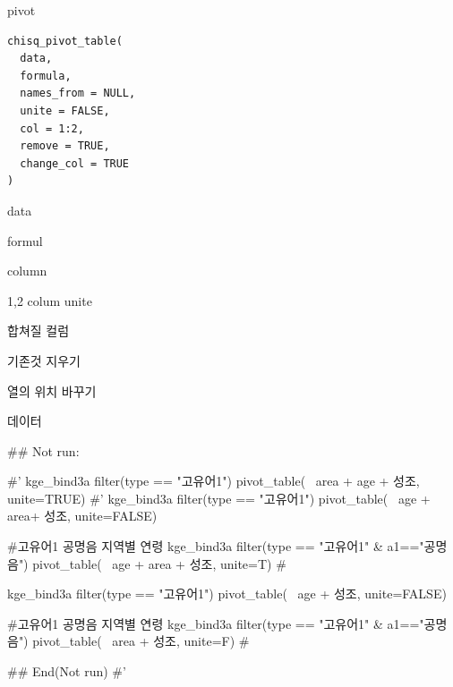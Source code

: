 \documentclass[a4paper]{book}
\begin{document}
%
\begin{Description}
pivot
\end{Description}
%
\begin{Usage}
\begin{verbatim}
chisq_pivot_table(
  data,
  formula,
  names_from = NULL,
  unite = FALSE,
  col = 1:2,
  remove = TRUE,
  change_col = TRUE
)
\end{verbatim}
\end{Usage}
%
\begin{Arguments}
\begin{ldescription}
\item[\code{data}] data

\item[\code{formula}] formul

\item[\code{names\_from}] column

\item[\code{unite}] 1,2 colum unite

\item[\code{col}] 합쳐질 컬럼

\item[\code{remove}] 기존것 지우기

\item[\code{change\_col}] 열의 위치 바꾸기
\end{ldescription}
\end{Arguments}
%
\begin{Value}
데이터
\end{Value}
%
\begin{Examples}
\begin{ExampleCode}

\#\# Not run: 

#' kge_bind3a %
filter(type == "고유어1")%
  pivot_table(~ area + age + 성조, unite=TRUE)
#'
kge_bind3a %
  filter(type == "고유어1")%
  pivot_table(~  age + area+ 성조, unite=FALSE)

#고유어1 공명음  지역별 연령
kge_bind3a %
  filter(type == "고유어1" & a1=="공명음")%
  pivot_table(~ age + area + 성조, unite=T)  #%



kge_bind3a %
  filter(type == "고유어1")%
  pivot_table(~  age +  성조, unite=FALSE)

#고유어1 공명음  지역별 연령
kge_bind3a %
  filter(type == "고유어1" & a1=="공명음")%
  pivot_table(~  area + 성조, unite=F)  #%


  
## End(Not run)
#'

\end{ExampleCode}
\end{Examples}
\end{document}
